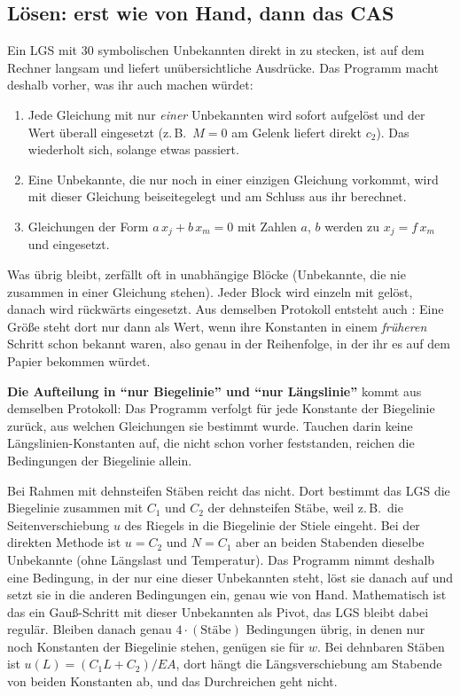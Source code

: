 \subsection{Lösen: erst wie von Hand, dann das CAS}

Ein LGS mit 30 symbolischen Unbekannten direkt in  zu stecken, ist auf dem Rechner
langsam und liefert unübersichtliche Ausdrücke. Das Programm macht deshalb vorher, was ihr auch
machen würdet:

\begin{enumerate}
  \item Jede Gleichung mit nur \emph{einer} Unbekannten wird sofort aufgelöst und der Wert überall
        eingesetzt (z.\,B.\ $M = 0$ am Gelenk liefert direkt $c_2$). Das wiederholt sich, solange
        etwas passiert.
  \item Eine Unbekannte, die nur noch in einer einzigen Gleichung vorkommt, wird mit dieser
        Gleichung beiseitegelegt und am Schluss aus ihr berechnet.
  \item Gleichungen der Form $a\,x_j + b\,x_m = 0$ mit Zahlen $a$, $b$ werden zu $x_j = f\,x_m$
        und eingesetzt.
\end{enumerate}

Was übrig bleibt, zerfällt oft in unabhängige Blöcke (Unbekannte, die nie zusammen in einer
Gleichung stehen). Jeder Block wird einzeln mit  gelöst, danach wird
rückwärts eingesetzt. Aus demselben Protokoll entsteht auch : Eine Größe steht dort
nur dann als Wert, wenn ihre Konstanten in einem \emph{früheren} Schritt schon bekannt waren,
also genau in der Reihenfolge, in der ihr es auf dem Papier bekommen würdet.

\textbf{Die Aufteilung in \enquote{nur Biegelinie} und \enquote{nur Längslinie}} kommt aus
demselben Protokoll: Das Programm verfolgt für jede Konstante der Biegelinie zurück, aus welchen
Gleichungen sie bestimmt wurde. Tauchen darin keine Längslinien-Konstanten auf, die nicht schon
vorher feststanden, reichen die Bedingungen der Biegelinie allein.

Bei Rahmen mit dehnsteifen Stäben reicht das nicht. Dort bestimmt das LGS die Biegelinie zusammen
mit $C_1$ und $C_2$ der dehnsteifen Stäbe, weil z.\,B.\ die Seitenverschiebung $u$ des Riegels in
die Biegelinie der Stiele eingeht. Bei der direkten Methode ist $u = C_2$ und $N = C_1$ aber an
beiden Stabenden dieselbe Unbekannte (ohne Längslast und Temperatur). Das Programm nimmt deshalb
eine Bedingung, in der nur eine dieser Unbekannten steht, löst sie danach auf und setzt sie in die
anderen Bedingungen ein, genau wie von Hand. Mathematisch ist das ein Gauß-Schritt mit dieser
Unbekannten als Pivot, das LGS bleibt dabei regulär. Bleiben danach genau $4\cdot(\text{Stäbe})$
Bedingungen übrig, in denen nur noch Konstanten der Biegelinie stehen, genügen sie für $w$. Bei
dehnbaren Stäben ist $u(L) = (C_1 L + C_2)/EA$, dort hängt die Längsverschiebung am Stabende von
beiden Konstanten ab, und das Durchreichen geht nicht.

